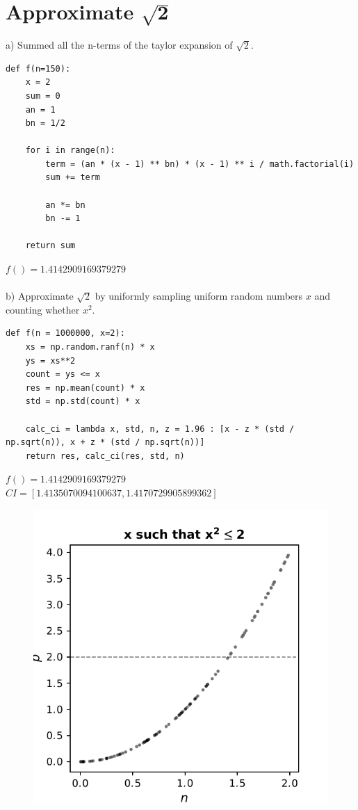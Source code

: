 \documentclass{article}
\begin{document}
\pagebreak


\section{Approximate $\mathbf{\sqrt{2}}$}

a)  Summed all the n-terms of the taylor expansion of $\sqrt{2}$.
\\
\begin{lstlisting}
def f(n=150):
	x = 2
	sum = 0
	an = 1
	bn = 1/2
	
	for i in range(n):
		term = (an * (x - 1) ** bn) * (x - 1) ** i / math.factorial(i)
		sum += term
		
		an *= bn
		bn -= 1
	
	return sum
\end{lstlisting}
\vspace{10pt}
\noindent
$f()=1.4142909169379279$
\\
\\


\noindent
b) Approximate $\sqrt{2}$ by uniformly sampling uniform random numbers $x$ and counting whether $x^2$.
\\
\begin{multicols}{2}
\begin{lstlisting}
def f(n = 1000000, x=2):
	xs = np.random.ranf(n) * x
	ys = xs**2
	count = ys <= x
	res = np.mean(count) * x
	std = np.std(count) * x
	
	calc_ci = lambda x, std, n, z = 1.96 : [x - z * (std / np.sqrt(n)), x + z * (std / np.sqrt(n))]
	return res, calc_ci(res, std, n)
\end{lstlisting}
\vspace{10pt}
\noindent
$f()=1.4142909169379279$ \\
$CI=[1.4135070094100637, 1.4170729905899362]$

\columnbreak
\begin{figure}[H]
	\centering
	\includegraphics[width=0.8\linewidth]{../drawings/p2_2}
\end{figure}
\end{multicols}
\end{document}
